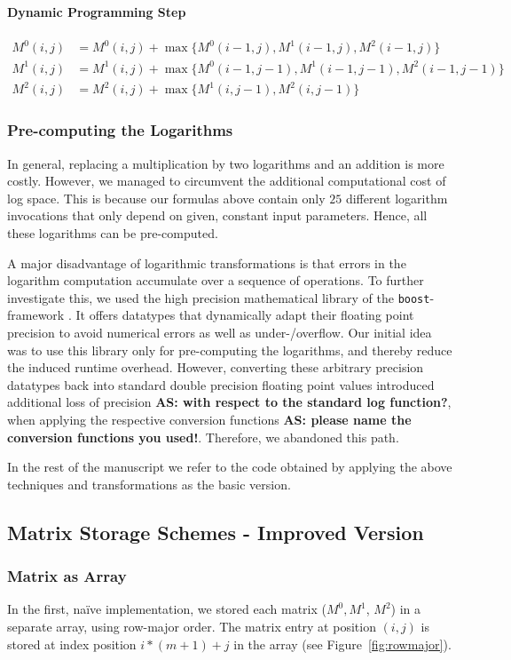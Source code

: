 \documentclass[runningheads,a4paper]{llncs}
\begin{document}
\paragraph{Dynamic Programming Step}
\begin{align*}
M^0(i,j) &= M^0(i,j) + \max\{M^0(i-1,j), M^1(i-1,j), M^2(i-1,j)\} \\
M^1(i,j) &= M^1(i,j) + \max\{M^0(i-1,j-1), M^1(i-1,j-1), M^2(i-1,j-1)\} \\
M^2(i,j) &= M^2(i,j) + \max\{M^1(i,j-1), M^2(i,j-1)\}
\end{align*}

\subsubsection{Pre-computing the Logarithms}
In general, replacing a multiplication by two logarithms and an addition is more costly.
However, we managed to circumvent the additional computational cost of log space.
This is because our formulas above contain only $25$ different logarithm invocations that only depend on given, constant input parameters.
Hence, all these logarithms can be pre-computed.

A major disadvantage of logarithmic transformations is that errors in the logarithm computation accumulate over a sequence of operations.
To further investigate this, we used the high precision mathematical library of the \texttt{boost}-framework \cite{boost}.
It offers datatypes that dynamically adapt their floating point precision to avoid numerical errors as well as under-/overflow.
Our initial idea was to use this library only for pre-computing the logarithms, and thereby reduce the induced runtime overhead.
However, converting these arbitrary precision datatypes back into standard double precision floating point values
introduced additional loss of precision {\bf AS: with respect to the standard log function?},
when applying the respective conversion functions {\bf AS: please name the conversion functions you used!}.
Therefore, we abandoned this path.

In the rest of the manuscript we refer to the code obtained by applying the above techniques and transformations as the basic version.

\subsection{Matrix Storage Schemes - Improved Version}
\label{sec:caching}

\subsubsection{Matrix as Array}
In the first, na\"ive implementation, we stored each matrix ($M^0, M^1$, $M^2$) in a separate array, using row-major order.
The matrix entry at position $(i,j)$ is stored at index position $i*(m+1)+j$ in the array (see Figure~\ref{fig:rowmajor}).
\end{document}

